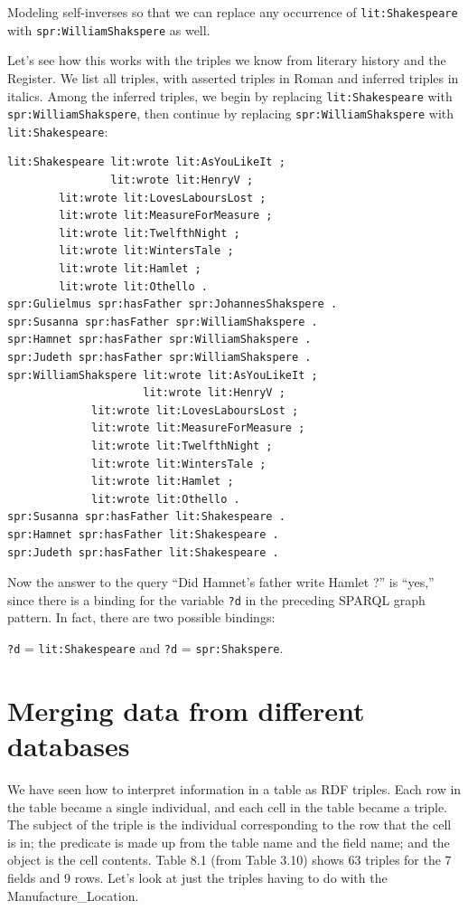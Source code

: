 \begin{challenge}{Modeling self-inverses}
so that we can replace any occurrence of \texttt{lit:Shakespeare} with
\texttt{spr:WilliamShakspere}
as well.

Let's see how this works with the triples we know from literary history
and the Register. We list all triples, with asserted triples in Roman
and inferred triples in italics. Among the inferred triples, we
begin by replacing \texttt{lit:Shakespeare} with \texttt{spr:WilliamShakspere}, then
continue by replacing \texttt{spr:WilliamShakspere} with \texttt{lit:Shakespeare}:

\begin{lstlisting}
lit:Shakespeare lit:wrote lit:AsYouLikeIt ;
                lit:wrote lit:HenryV ;
		lit:wrote lit:LovesLaboursLost ;
		lit:wrote lit:MeasureForMeasure ;
		lit:wrote lit:TwelfthNight ;
		lit:wrote lit:WintersTale ;
		lit:wrote lit:Hamlet ;
		lit:wrote lit:Othello .
spr:Gulielmus spr:hasFather spr:JohannesShakspere .
spr:Susanna spr:hasFather spr:WilliamShakspere .
spr:Hamnet spr:hasFather spr:WilliamShakspere .
spr:Judeth spr:hasFather spr:WilliamShakspere .
spr:WilliamShakspere lit:wrote lit:AsYouLikeIt ;  
                     lit:wrote lit:HenryV ;
		     lit:wrote lit:LovesLaboursLost ;
		     lit:wrote lit:MeasureForMeasure ;
		     lit:wrote lit:TwelfthNight ;
		     lit:wrote lit:WintersTale ;
		     lit:wrote lit:Hamlet ;
		     lit:wrote lit:Othello .
spr:Susanna spr:hasFather lit:Shakespeare .
spr:Hamnet spr:hasFather lit:Shakespeare .
spr:Judeth spr:hasFather lit:Shakespeare .
\end{lstlisting}

Now the answer to the query ``Did Hamnet's father write Hamlet ?'' is
``yes,'' since there is a binding for the variable \texttt{?d} in the preceding
SPARQL graph pattern. In fact, there are two possible bindings:

\texttt{?d} = \texttt{lit:Shakespeare} and \texttt{?d} = \texttt{spr:Shakspere}.
\end{challenge}


\section{Merging data from different databases}

We have seen how to interpret information in a table as RDF triples.
Each row in the table became a single individual, and each cell in the
table became a triple. The subject of the triple is the individual
corresponding to the row that the cell is in; the predicate is made up
from the table name and the field name; and the object is the cell
contents. Table 8.1 (from Table 3.10) shows
63 triples for the 7 fields and 9 rows. Let's look at just the triples
having to do with the
Manufacture\_Location.

